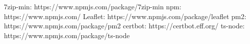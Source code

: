 \documentclass[conference]{IEEEtran}
\begin{document}
\begin{thebibliography}{99}
     7zip-min: https://www.npmjs.com/package/7zip-min
     npm: https://www.npmjs.com/
     Leaflet: https://www.npmjs.com/package/leaflet
     pm2: https://www.npmjs.com/package/pm2
     certbot: https://certbot.eff.org/
     ts-node: https://www.npmjs.com/package/ts-node
\end{thebibliography}
\end{document}
